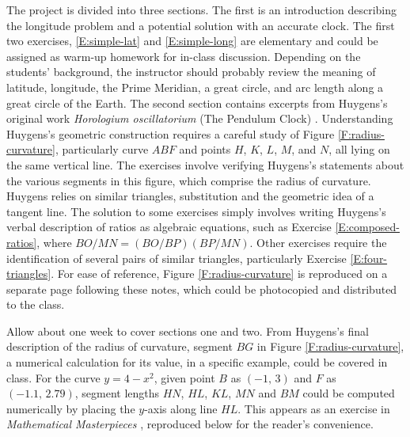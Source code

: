 \documentclass[12pt]{article}
\theoremstyle{definition}
\begin{document}
The project is divided into three sections.  The first is an
introduction describing the longitude problem and a potential solution
with an accurate clock.  The first two exercises, \eqref{E:simple-lat}
and \eqref{E:simple-long} are elementary and could be assigned as
warm-up homework for in-class discussion.  Depending on the students'
background, the instructor should probably review the meaning of
latitude, longitude, the Prime Meridian, a great circle, and arc
length along a great circle of the Earth.    
The second section contains
excerpts from Huygens's original work {\em Horologium oscillatorium}
(The Pendulum Clock) \cite{Blackwell, Huygens}.  Understanding
Huygens's geometric construction requires a careful study of Figure  
\ref{F:radius-curvature}, particularly curve $ABF$ and points $H$,
$K$, $L$, $M$, and $N$, all lying on the same vertical line.  The
exercises involve verifying Huygens's statements about the various
segments in this figure, which comprise the radius of curvature.
Huygens relies on similar triangles, substitution and the geometric
idea of a tangent line.  The solution to some exercises simply involves
writing Huygens's verbal description of ratios as algebraic equations,
such as Exercise \eqref{E:composed-ratios}, where $BO/MN = (BO/BP)(BP/MN)$.  
Other exercises require the identification of several pairs of
similar triangles, particularly Exercise
\eqref{E:four-triangles}.  For ease of reference, Figure
\ref{F:radius-curvature} is reproduced on a separate page following these
notes, which could be photocopied and distributed to the class.

Allow about one week to cover sections one
and two.  From Huygens's final description of the radius of curvature,
segment $BG$ in Figure \ref{F:radius-curvature}, a numerical
calculation for its value, in a specific example,  could be covered 
in class.  For the curve $y = 4 - x^2$, given point $B$ as
$(-1, \, 3)$ and $F$ as $(-1.1, \, 2.79)$, segment lengths $HN$, $HL$, $KL$,
$MN$ and $BM$ could be computed numerically by placing the $y$-axis
along line $HL$.  This appears as an exercise in {\em Mathematical Masterpieces}
\cite[p.\ 176]{Knoebel}, reproduced below for the reader's convenience.  
\end{document}
